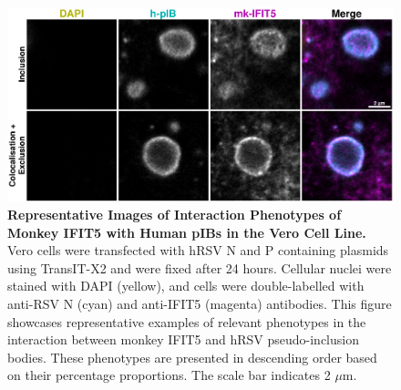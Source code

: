 \begin{figure}
    \centering
    \includegraphics[width=1\linewidth]{09. Chapter 4/Figs/01. pIB/05. IFIT5/03. i5-vero-hnhp.pdf}
    \caption[Representative Images of Interaction Phenotypes of Monkey IFIT5 with Human pIBs in the Vero Cell Line.]{\textbf{Representative Images of Interaction Phenotypes of Monkey IFIT5 with Human pIBs in the Vero Cell Line.} Vero cells were transfected with hRSV N and P containing plasmids using TransIT-X2 and were fixed after 24 hours. Cellular nuclei were stained with DAPI (yellow), and cells were double-labelled with anti-RSV N (cyan) and anti-IFIT5 (magenta) antibodies. This figure showcases representative examples of relevant phenotypes in the interaction between monkey IFIT5 and hRSV pseudo-inclusion bodies. These phenotypes are presented in descending order based on their percentage proportions. The scale bar indicates 2 \(\mu \mbox{m}\).}
    \label{fig:Representative Images of Interaction Phenotypes of Monkey IFIT5 with Human pIBs in the VERO Cell Line}
\end{figure}

